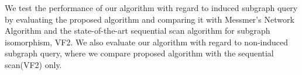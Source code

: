 
We test the performance of our algorithm with regard to induced subgraph query by evaluating the proposed algorithm and comparing it with Messmer's Network Algorithm and the state-of-the-art sequential scan algorithm for subgraph isomorphism, VF2\cite{cordella2001_vf2}.
We also evaluate our algorithm with regard to non-induced subgraph query, where we compare proposed algorithm with the sequential scan(VF2) only.


